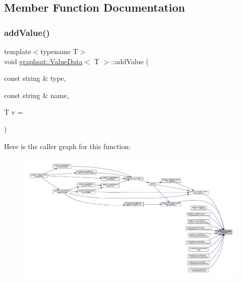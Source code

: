 \subsection{Member Function Documentation}
\mbox{\label{classgraphsat_1_1_value_data_a96406cf8892e187bc37fccb5c8f5f130}} 
\subsubsection{\texorpdfstring{addValue()}{addValue()}}
{\footnotesize\ttfamily template$<$typename T$>$ \\
void \mbox{\hyperlink{classgraphsat_1_1_value_data}{graphsat\+::\+Value\+Data}}$<$ T $>$\+::add\+Value (\begin{DoxyParamCaption}\item[{const string \&}]{type,  }\item[{const string \&}]{name,  }\item[{T}]{v = {} }\end{DoxyParamCaption})\hspace{0.3cm}{\ttfamily [inline]}}

Here is the caller graph for this function\+:
\nopagebreak
\begin{figure}[H]
\begin{center}
\leavevmode
\includegraphics[width=350pt]{classgraphsat_1_1_value_data_a96406cf8892e187bc37fccb5c8f5f130_icgraph}
\end{center}
\end{figure}
\mbox{\label{classgraphsat_1_1_value_data_a01ec9ee50f85bff7eaa5a29e2b5c7d53}} 
